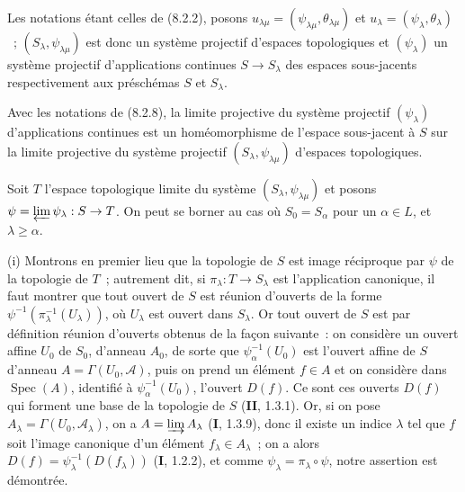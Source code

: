 \begin{env}[8.2.8]
\label{IV.8.2.8-fr}
Les notations étant celles de (8.2.2), posons
$u_{\lambda\mu}=(\psi_{\lambda\mu},\theta_{\lambda\mu})$ et
$u_\lambda=(\psi_\lambda,\theta_\lambda)$~; $(S_\lambda,\psi_{\lambda\mu})$
est donc un système projectif d'espaces topologiques et $(\psi_\lambda)$ un
système projectif d'applications continues $S\to S_\lambda$ des espaces
sous-jacents respectivement aux préschémas $S$ et $S_\lambda$.
\end{env}

\begin{proposition}[8.2.9]
\label{IV.8.2.9-fr}
Avec les notations de \textup{(8.2.8)}, la limite projective du système projectif
$(\psi_\lambda)$ d'applications continues est un homéomorphisme de l'espace
sous-jacent à $S$ sur la limite projective du système projectif
$(S_\lambda,\psi_{\lambda\mu})$ d'espaces topologiques.
\end{proposition}

Soit $T$ l'espace topologique limite du système
$(S_\lambda,\psi_{\lambda\mu})$ et posons
$\psi=\varprojlim\psi_\lambda:S\to T$. On peut se borner au cas où
$S_0=S_\alpha$ pour un $\alpha\in L$, et $\lambda\geq\alpha$.

\medskip
\noindent
(i) Montrons en premier lieu que la topologie de $S$ est image réciproque par
$\psi$ de la topologie de $T$~; autrement dit, si
$\pi_\lambda:T\to S_\lambda$ est l'application canonique, il faut montrer
que tout ouvert de $S$ est réunion d'ouverts de la forme
$\psi^{-1}(\pi_\lambda^{-1}(U_\lambda))$, où $U_\lambda$ est ouvert dans
$S_\lambda$. Or tout ouvert de $S$ est par définition réunion d'ouverts
obtenus de la façon suivante~: on considère un ouvert affine $U_0$ de $S_0$,
d'anneau $A_0$, de sorte que $\psi_\alpha^{-1}(U_0)$ est l'ouvert affine de
$S$ d'anneau $A=\Gamma(U_0,\mathscr A)$, puis on prend un élément $f\in A$ et
on considère dans $\operatorname{Spec}(A)$, identifié à
$\psi_\alpha^{-1}(U_0)$, l'ouvert $D(f)$. Ce sont ces ouverts $D(f)$ qui
forment une base de la topologie de $S$ (\textbf{II}, 1.3.1). Or, si on pose
$A_\lambda=\Gamma(U_0,\mathscr A_\lambda)$, on a
$A=\varinjlim A_\lambda$ (\textbf{I}, 1.3.9), donc il existe un indice $\lambda$ tel
que $f$ soit l'image canonique d'un élément $f_\lambda\in A_\lambda$~; on a
alors $D(f)=\psi_\lambda^{-1}(D(f_\lambda))$ (\textbf{I}, 1.2.2), et comme
$\psi_\lambda=\pi_\lambda\circ\psi$, notre assertion est démontrée.

